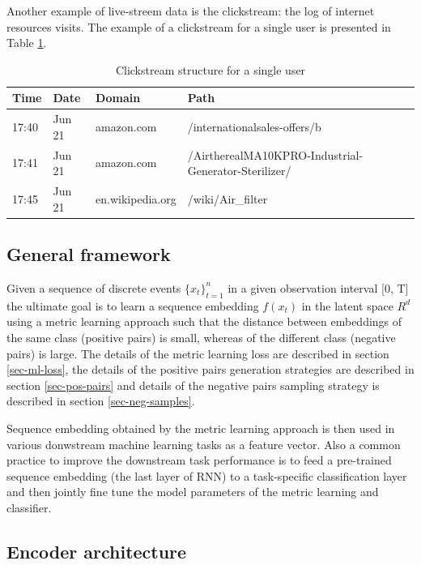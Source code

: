 \documentclass[sigconf]{acmart}
\begin{document}
Another example of live-streem data is the clickstream: the log of internet resources visits. The example of a clickstream for a single user is presented in Table \ref{tab-cs-data}.

\begin{table}[ht]
\caption{Clickstream structure for a single user}
\begin{tabular}{ | m{2em} m{3em} m{6em} m{10em}| }
\hline
\textbf{Time} & \textbf{Date} & \textbf{Domain} & \textbf{Path} \\
\hline
17:40 & Jun 21 & amazon.com & /international\-sales-offers/b \\
17:41 & Jun 21 & amazon.com & /Airthereal\-MA10K\-PRO-Industrial-Generator-Sterilizer/ \\
17:45 & Jun 21 & en.wikipedia.org & /wiki\-/Air\_filter \\
\hline
\end{tabular}
\label{tab-cs-data}
\end{table}

\subsection{General framework}

Given a sequence of discrete events $\{x_t \}^n_{t=1}$ in a given observation interval [0, T]
the ultimate goal is to learn a sequence embedding $f(x_t)$ in the latent space $R^d$ using a metric learning approach such that the distance between embeddings of the same class (positive pairs) is small, whereas of the different class (negative pairs) is large. The details of the metric learning loss are described in section \ref{sec-ml-loss}, the details of the positive pairs generation strategies are described in section \ref{sec-pos-pairs} and details of the negative pairs sampling strategy is described in section \ref{sec-neg-samples}.


Sequence embedding obtained by the metric learning approach is then used in various donwstream machine learning tasks as a feature vector. Also a common practice to improve the downstream task performance is to feed a pre-trained sequence embedding (the last layer of RNN) to a task-specific classification layer and then jointly fine tune the model parameters of the metric learning and classifier.

\subsection{Encoder architecture} \label{sec-enc-arch}
\end{document}
